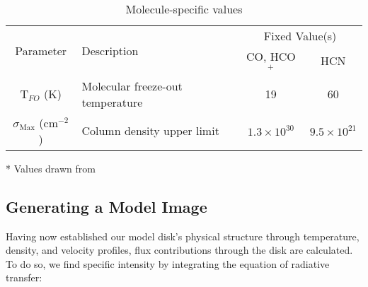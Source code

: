 \begin{table}
  \begin{threeparttable}
    \centering
    \caption{Molecule-specific values}
    \label{tab:mol_specifics}
    \renewcommand{\arraystretch}{1.2}
    \begin{tabular}{c  l  c c }
      \toprule \toprule
      \multirow{2}{*}{Parameter} & \multirow{2}{*}{Description}    & \multicolumn{2}{c}{Fixed Value(s)} \\
                                 &                                 & CO, HCO$^+$ & HCN \\
      \midrule %
      T$_{FO}$ (K)           &  Molecular freeze-out temperature   &  19 & 60    \\
      $\sigma_\text{Max}$ (cm$^{-2}$) & Column density upper limit &  $1.3 \times 10^{30}$ & $9.5 \times 10^{21}$  \\
      \bottomrule
    \end{tabular}
    \begin{tablenotes}\footnotesize
      \item[*] Values drawn from \cite{Factor2017}
    \end{tablenotes}
  \end{threeparttable}
\end{table}








\subsection{Generating a Model Image}

Having now established our model disk's physical structure through temperature, density, and velocity profiles, flux contributions through the disk are calculated. To do so, we find specific intensity by integrating the equation of radiative transfer:

